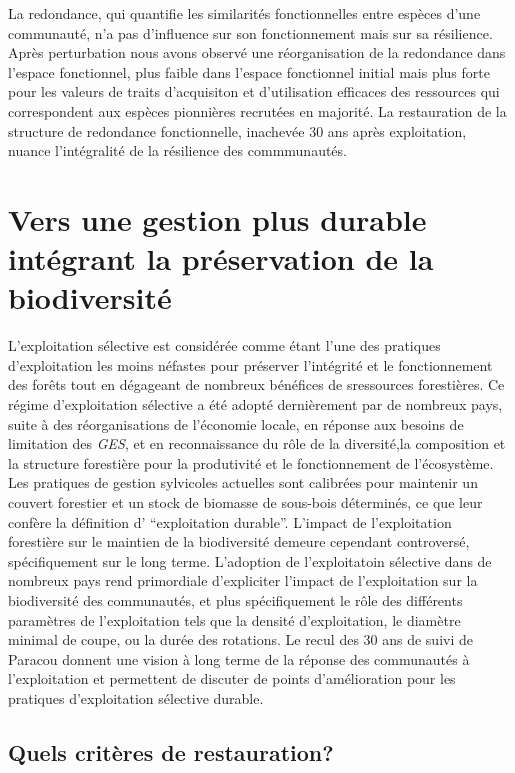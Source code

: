 \documentclass[
  11pt,
  french,
  A4paper,
  extrafontsizes,onecolumn,openright
  ]{memoir}
\begin{document}
La redondance, qui quantifie les similarités fonctionnelles entre
espèces d'une communauté, n'a pas d'influence sur son fonctionnement
mais sur sa résilience. Après perturbation nous avons observé une
réorganisation de la redondance dans l'espace fonctionnel, plus faible
dans l'espace fonctionnel initial mais plus forte pour les valeurs de
traits d'acquisiton et d'utilisation efficaces des ressources qui
correspondent aux espèces pionnières recrutées en majorité. La
restauration de la structure de redondance fonctionnelle, inachevée 30
ans après exploitation, nuance l'intégralité de la résilience des
commmunautés.

\section{Vers une gestion plus durable intégrant la préservation de la
biodiversité}\label{vers-une-gestion-plus-durable-integrant-la-preservation-de-la-biodiversite}

L'exploitation sélective est considérée comme étant l'une des pratiques
d'exploitation les moins néfastes pour préserver l'intégrité et le
fonctionnement des forêts tout en dégageant de nombreux bénéfices de
sressources forestières. Ce régime d'exploitation sélective a été adopté
dernièrement par de nombreux pays, suite à des réorganisations de
l'économie locale, en réponse aux besoins de limitation des \emph{GES},
et en reconnaissance du rôle de la diversité,la composition et la
structure forestière pour la produtivité et le fonctionnement de
l'écosystème. Les pratiques de gestion sylvicoles actuelles sont
calibrées pour maintenir un couvert forestier et un stock de biomasse de
sous-bois déterminés, ce que leur confère la définition d'
``exploitation durable''. L'impact de l'exploitation forestière sur le
maintien de la biodiversité demeure cependant controversé,
spécifiquement sur le long terme. L'adoption de l'exploitatoin sélective
dans de nombreux pays rend primordiale d'expliciter l'impact de
l'exploitation sur la biodiversité des communautés, et plus
spécifiquement le rôle des différents paramètres de l'exploitation tels
que la densité d'exploitation, le diamètre minimal de coupe, ou la durée
des rotations. Le recul des 30 ans de suivi de Paracou donnent une
vision à long terme de la réponse des communautés à l'exploitation et
permettent de discuter de points d'amélioration pour les pratiques
d'exploitation sélective durable.

\subsection{Quels critères de
restauration?}\label{quels-criteres-de-restauration}
\end{document}
